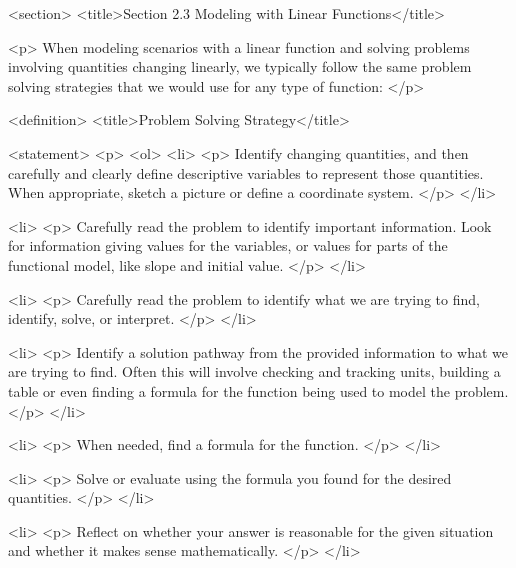 <section>
    <title>Section 2.3 Modeling with Linear Functions</title>

    <p>
        When modeling scenarios with a linear function and solving problems involving quantities changing linearly, we typically follow the same problem solving strategies that we would use for any type of function:
    </p>

    <definition>
        <title>Problem Solving Strategy</title>

        <statement>
            <p>
                <ol>
                    <li>
                        <p>
                            Identify changing quantities, and then carefully and clearly define descriptive variables to represent those quantities.
                            When appropriate, sketch a picture or define a coordinate system.
                        </p>
                    </li>

                    <li>
                        <p>
                            Carefully read the problem to identify important information.
                            Look for information giving values for the variables, or values for parts of the functional model, like slope and initial value.
                        </p>
                    </li>

                    <li>
                        <p>
                            Carefully read the problem to identify what we are trying to find, identify, solve, or interpret.
                        </p>
                    </li>

                    <li>
                        <p>
                            Identify a solution pathway from the provided information to what we are trying to find.
                            Often this will involve checking and tracking units, building a table or even finding a formula for the function being used to model the problem.
                        </p>
                    </li>

                    <li>
                        <p>
                            When needed, find a formula for the function.
                        </p>
                    </li>

                    <li>
                        <p>
                            Solve or evaluate using the formula you found for the desired quantities.
                        </p>
                    </li>

                    <li>
                        <p>
                            Reflect on whether your answer is reasonable for the given situation and whether it makes sense mathematically.
                        </p>
                    </li>

